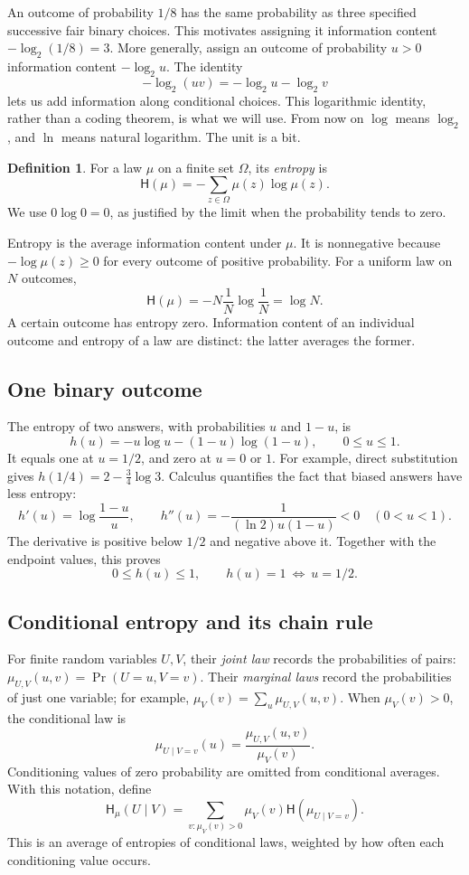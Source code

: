 \documentclass[11pt]{article}
\theoremstyle{definition}
\newtheorem{definition}[theorem]{Definition}
\theoremstyle{remark}
\newcommand{\Ent}{\mathsf H}
\numberwithin{equation}{section}
\begin{document}
An outcome of probability \(1/8\) has the same probability as three
specified successive fair binary choices. This motivates assigning
it information content \(-\log_2(1/8)=3\). More generally, assign
an outcome of probability \(u>0\) information content \(-\log_2u\).
The identity
\[
 -\log_2(uv)=-\log_2u-\log_2v
\]
lets us add information along conditional choices. This logarithmic
identity, rather than a coding theorem, is what we will use.
From now on \(\log\) means \(\log_2\), and \(\ln\) means natural
logarithm. The unit is a bit.

\begin{definition}
For a law \(\mu\) on a finite set \(\Omega\), its \emph{entropy} is
\[
 \Ent(\mu)=-\sum_{z\in\Omega}\mu(z)\log\mu(z).
\]
We use \(0\log0=0\), as justified by the limit when the probability
tends to zero.
\end{definition}

Entropy is the average information content under \(\mu\). It is
nonnegative because \(-\log\mu(z)\ge0\) for every outcome of positive
probability. For a uniform law on \(N\) outcomes,
\[
 \Ent(\mu)=-N\frac1N\log\frac1N=\log N.
\]
A certain outcome has entropy zero. Information content of an
individual outcome and entropy of a law are distinct: the latter
averages the former.

\subsection{One binary outcome}

The entropy of two answers, with probabilities \(u\) and \(1-u\), is
\[
 h(u)=-u\log u-(1-u)\log(1-u),\qquad 0\le u\le1.
\]
It equals one at \(u=1/2\), and zero at \(u=0\) or \(1\).
For example, direct substitution gives
\(h(1/4)=2-\tfrac34\log3\).
Calculus quantifies the fact that biased answers have less entropy:
\[
 h'(u)=\log\frac{1-u}{u},\qquad
 h''(u)=-\frac1{(\ln2)u(1-u)}<0\quad(0<u<1).
\]
The derivative is positive below \(1/2\) and negative above it.
Together with the endpoint values, this proves
\begin{equation}\label{eq:hbound}
 0\le h(u)\le1,\qquad h(u)=1\ \Longleftrightarrow\ u=1/2.
\end{equation}

\subsection{Conditional entropy and its chain rule}

For finite random variables \(U,V\), their \emph{joint law} records
the probabilities of pairs:
\(\mu_{U,V}(u,v)=\Pr(U=u,V=v)\).
Their \emph{marginal laws} record the probabilities of just one
variable; for example,
\(\mu_V(v)=\sum_u\mu_{U,V}(u,v)\).
When \(\mu_V(v)>0\), the conditional law is
\[
 \mu_{U\mid V=v}(u)=\frac{\mu_{U,V}(u,v)}{\mu_V(v)}.
\]
Conditioning values of zero probability are omitted from conditional
averages. With this notation, define
\[
 \Ent_\mu(U\mid V)
 =\sum_{v:\mu_V(v)>0}\mu_V(v)\Ent(\mu_{U\mid V=v}).
\]
This is an average of entropies of conditional laws, weighted by how
often each conditioning value occurs.
\end{document}
